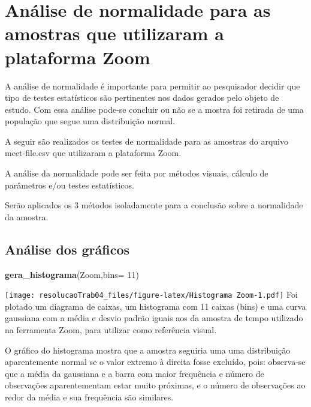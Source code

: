 \documentclass[
]{article}
\newenvironment{Shaded}{\begin{snugshade}}{\end{snugshade}}
\newcommand{\DataTypeTok}[1]{\textcolor[rgb]{0.13,0.29,0.53}{#1}}
\newcommand{\DecValTok}[1]{\textcolor[rgb]{0.00,0.00,0.81}{#1}}
\newcommand{\KeywordTok}[1]{\textcolor[rgb]{0.13,0.29,0.53}{\textbf{#1}}}
\newcommand{\NormalTok}[1]{#1}
\begin{document}
\hypertarget{anuxe1lise-de-normalidade-para-as-amostras-que-utilizaram-a-plataforma-zoom}{%
\section{Análise de normalidade para as amostras que utilizaram a
plataforma
Zoom}\label{anuxe1lise-de-normalidade-para-as-amostras-que-utilizaram-a-plataforma-zoom}}

A análise de normalidade é importante para permitir ao pesquisador
decidir que tipo de testes estatísticos são pertinentes nos dados
gerados pelo objeto de estudo. Com essa análise pode-se concluir ou não
se a mostra foi retirada de uma população que segue uma distribuição
normal.

A seguir são realizados os testes de normalidade para as amostras do
arquivo meet-file.csv que utilizaram a plataforma Zoom.

A análise da normalidade pode ser feita por métodos visuais, cálculo de
parâmetros e/ou testes estatísticos.

Serão aplicados os 3 métodos isoladamente para a conclusão sobre a
normalidade da amostra.

\hypertarget{anuxe1lise-dos-gruxe1ficos}{%
\subsection{Análise dos gráficos}\label{anuxe1lise-dos-gruxe1ficos}}

\begin{Shaded}
\begin{Highlighting}[]
\KeywordTok{gera_histograma}\NormalTok{(Zoom,}\DataTypeTok{bins=} \DecValTok{11}\NormalTok{)}
\end{Highlighting}
\end{Shaded}

\texttt{[image: resolucaoTrab04\_files/figure-latex/Histograma Zoom-1.pdf]}
Foi plotado um diagrama de caixas, um histograma com 11 caixas (bins) e
uma curva gaussiana com a média e desvio padrão iguais aos da amostra de
tempo utilizado na ferramenta Zoom, para utilizar como referência
visual.

O gráfico do histograma mostra que a amostra seguiria uma uma
distribuição aparentemente normal se o valor extremo à direita fosse
excluído, pois: observa-se que a média da gaussiana e a barra com maior
frequência e número de observações aparentementam estar muito próximas,
e o número de observações ao redor da média e sua frequência são
similares.
\end{document}
